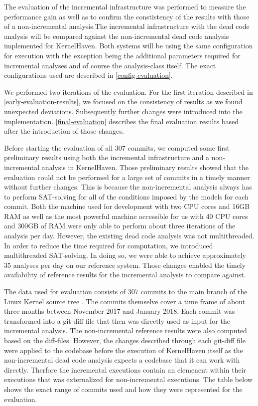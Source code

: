 \documentclass[a4paper]{article}
\begin{document}
The evaluation of the incremental infrastructure was performed to measure the performance gain as well as to confirm the constistency of the results with those of a non-incremental analysis.The incremental infrastructure with the dead code analysis will be compared against the non-incremental dead code analysis implemented for KernelHaven. Both systems will be using the same configuration for execution with the exception being the additional parameters required for incremental analyses and of course the analysis-class itself. The exact configurations used are described in \autoref{config-evaluation}.

We performed two iterations of the evaluation. For the first iteration described in \autoref{early-evaluation-results}, we focused on the consistency of results as we found unexpected deviations. Subsequently further changes were introduced into the implementation. \autoref{final-evaluation} describes the final evaluation results based after the introduction of those changes.

Before starting the evaluation of all 307 commits, we computed some first preliminary results using both the incremental infrastructure and a non-incremental analysis in KernelHaven. Those preliminary results showed that the evaluation could not be performed for a large set of commits in a timely manner without further changes. This is because the non-incremental analysis always has to perform SAT-solving for all of the conditions imposed by the models for each commit. Both the machine used for development with two CPU cores and 16GB RAM as well as the most powerful machine accessible for us with 40 CPU cores and 300GB of RAM were only able to perform about three iterations of the analysis per day. However, the existing dead code analysis was not multithreaded. In order to reduce the time required for computation, we introduced multithreaded SAT-solving. In doing so, we were able to achieve approximately 35 analyses per day on our reference system. Those changes enabled the timely availability of reference results for the incremental analysis to compare against.

The data used for evaluation consists of 307 commits to the main branch of the Linux Kernel source tree \cite{linux}. The commits themselve cover a time frame of about three months between November 2017 and January 2018. Each commit was transformed into a git-diff file that then was directly used as input for the incremental analysis. The non-incremental reference results were also computed based on the diff-files. However, the changes described through each git-diff file were applied to the codebase before the execution of KernelHaven itself as the non-incremental dead code analysis expects a codebase that it can work with directly. Therfore the incremental executions contain an elemenent within their executions that was externalized for non-incremental executions. The table below shows the exact range of commits used and how they were represented for the evaluation.
\end{document}
